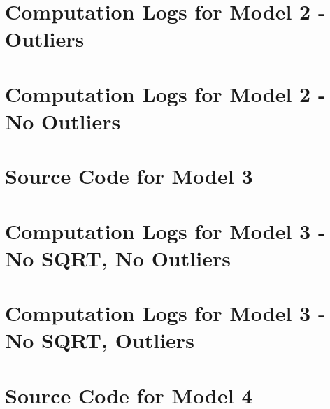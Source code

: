 \begin{landscape}
    \section{Computation Logs for Model 2 - Outliers}
    

    \newpage
    \section{Computation Logs for Model 2 - No Outliers}
    
\end{landscape}

\section{Source Code for Model 3}


\begin{landscape}
    \section{Computation Logs for Model 3 - No SQRT, No Outliers }
    

    \newpage
    \section{Computation Logs for Model 3 - No SQRT, Outliers }
    

\end{landscape}


\newpage
\section{Source Code for Model 4}


